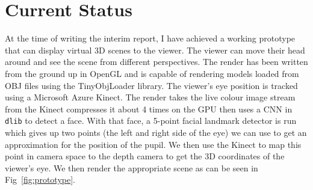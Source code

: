 \section{Current Status}
At the time of writing the interim report, I have achieved a working prototype that can display virtual 3D scenes to the viewer. The viewer can move their head around and see the scene from different perspectives. The render has been written from the ground up in OpenGL and is capable of rendering models loaded from OBJ files using the TinyObjLoader library. The viewer's eye position is tracked using a Microsoft Azure Kinect. The render takes the live colour image stream from the Kinect compresses it about 4 times on the GPU then uses a CNN in \texttt{dlib} to detect a face. With that face, a 5-point facial landmark detector is run which gives up two points (the left and right side of the eye) we can use to get an approximation for the position of the pupil. We then use the Kinect to map this point in camera space to the depth camera to get the 3D coordinates of the viewer's eye. We then render the appropriate scene as can be seen in Fig~\ref{fig:prototype}.

